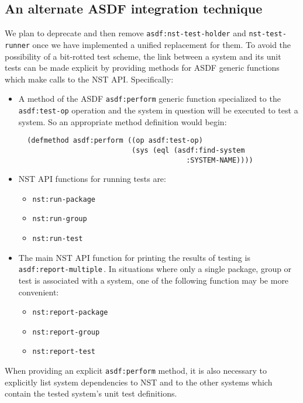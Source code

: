 \subsection{An alternate ASDF integration technique}
We plan to deprecate and then remove \texttt{asdf:nst-test-holder} and
\texttt{nst-test-runner} once we have implemented a unified
replacement for them.  To avoid the possibility of a bit-rotted test
scheme, the link between a system and its unit tests can be made
explicit by providing methods for ASDF generic functions which make
calls to the NST API.  Specifically:
\begin{itemize}
\item A method of the ASDF \texttt{asdf:perform} generic function
  specialized to the \texttt{asdf:test-op} operation and the system in
  question will be executed to test a system.  So an appropriate
  method definition would begin:
  \begin{verbatim}
  (defmethod asdf:perform ((op asdf:test-op)
                           (sys (eql (asdf:find-system
                                        :SYSTEM-NAME))))
\end{verbatim}
\item NST API functions for running tests are:
\begin{itemize}
\item\texttt{nst:run-package}
\item\texttt{nst:run-group}
\item\texttt{nst:run-test}
\end{itemize}
\item The main NST API function for printing the results of testing is
  \texttt{asdf:report-multiple}\,.  In situations where only a single
  package, group or test is associated with a system, one of the
  following function may be more convenient:
  \begin{itemize}
  \item\texttt{nst:report-package}
  \item\texttt{nst:report-group}
  \item\texttt{nst:report-test}
  \end{itemize}
\end{itemize}
When providing an explicit \texttt{asdf:perform} method, it is also
necessary to explicitly list system dependencies to NST and to the
other systems which contain the tested system's unit test definitions.


